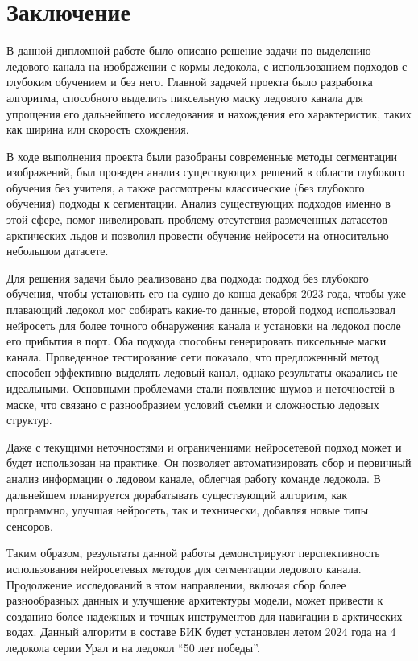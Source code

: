 \section{Заключение}

В данной дипломной работе было описано решение задачи по выделению ледового канала на изображении с кормы ледокола, с использованием подходов с глубоким обучением и без него.
Главной задачей проекта было разработка алгоритма, способного выделить пиксельную маску ледового канала для упрощения его дальнейшего исследования и нахождения его 
характеристик, таких как ширина или скорость схождения.

В ходе выполнения проекта были разобраны современные методы сегментации изображений, был проведен анализ существующих решений в области глубокого обучения без учителя, 
а также рассмотрены классические (без глубокого обучения) подходы к сегментации. Анализ существующих подходов именно в этой сфере, помог нивелировать проблему отсутствия
размеченных датасетов арктических льдов и позволил провести обучение нейросети на относительно небольшом датасете.

Для решения задачи было реализовано два подхода: подход без глубокого обучения, чтобы установить его на судно до конца декабря 2023 года, чтобы уже плавающий ледокол мог собирать 
какие-то данные, второй подход использовал нейросеть для более точного обнаружения канала и установки на ледокол после его прибытия в порт. Оба подхода способны генерировать пиксельные маски канала. 
Проведенное тестирование сети показало, что предложенный метод способен эффективно выделять ледовый канал, однако результаты оказались не идеальными. 
Основными проблемами стали появление шумов и неточностей в маске, что связано с разнообразием условий съемки и сложностью ледовых структур.

Даже с текущими неточностями и ограничениями нейросетевой подход может и будет использован на практике. Он позволяет автоматизировать сбор и первичный анализ информации
о ледовом канале, облегчая работу команде ледокола. В дальнейшем планируется дорабатывать существующий алгоритм, как программно, улучшая нейросеть, так и технически, 
добавляя новые типы сенсоров.

Таким образом, результаты данной работы демонстрируют перспективность использования нейросетевых методов для сегментации ледового канала. Продолжение 
исследований в этом направлении, включая сбор более разнообразных данных и улучшение архитектуры модели, может привести к созданию более надежных и 
точных инструментов для навигации в арктических водах. Данный алгоритм в составе БИК будет установлен летом 2024 года на 4 ледокола серии Урал и на ледокол ``50 лет победы''.